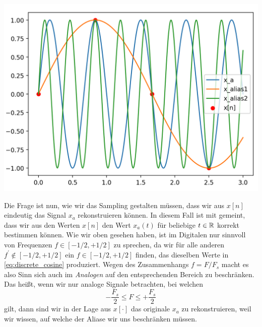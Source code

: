 \begin{listing}
    \noindent
    \begin{minipage}{0.49\textwidth}
        \strut\vspace*{-\baselineskip}\newline
        \inputminted[firstline=4]{python3}{code/aliasing.py}
    \end{minipage}%
    \begin{minipage}{0.49\textwidth}
        \strut\vspace*{-\baselineskip}\newline
        \includegraphics[width=\textwidth]{code/aliasing.png}
    \end{minipage}
    \label{py:aliasing}
\end{listing}

Die Frage ist nun, wie wir das Sampling gestalten müssen, dass wir aus $x[n]$ eindeutig das Signal $x_a$ rekonstruieren können.
In diesem Fall ist mit  gemeint, dass wir aus den Werten $x[n]$ den Wert $x_a(t)$ für beliebige $t \in \mathbb{R}$ korrekt bestimmen können.
Wie wir oben gesehen haben, ist im Digitalen nur sinnvoll von Frequenzen $f \in [-1/2,+1/2]$ zu sprechen, da wir für alle anderen $f^\prime \notin [-1/2,+1/2]$ ein $f \in [-1/2,+1/2]$ finden, das dieselben Werte in \eqref{eq:discrete_cosine} produziert.
Wegen des Zusammenhangs $f = F/F_s$ macht es also Sinn sich auch im \emph{Analogen} auf den entsprechenden Bereich zu beschränken.
Das heißt, wenn wir nur analoge Signale betrachten, bei welchen
\[
-\frac{F_s}2 \leqslant F \leqslant +\frac{F_s}2
\]
gilt, dann sind wir in der Lage aus $x[\cdot]$ das originale $x_a$ zu rekonstruieren, weil wir wissen, auf welche der Aliase wir uns beschränken müssen.

